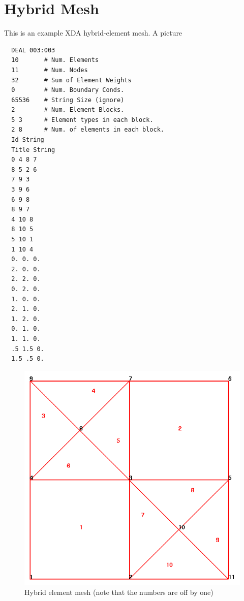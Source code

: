 \documentclass[12pt]{article}
\begin{document}
\clearpage
\appendix
\section{Hybrid Mesh}
This is an example XDA hybrid-element mesh.  A picture
\small
\begin{verbatim}
  DEAL 003:003
  10       # Num. Elements
  11       # Num. Nodes
  32       # Sum of Element Weights
  0        # Num. Boundary Conds.
  65536    # String Size (ignore)
  2        # Num. Element Blocks.
  5 3      # Element types in each block.
  2 8      # Num. of elements in each block.
  Id String
  Title String
  0 4 8 7
  8 5 2 6
  7 9 3
  3 9 6
  6 9 8
  8 9 7
  4 10 8
  8 10 5
  5 10 1
  1 10 4
  0. 0. 0.
  2. 0. 0.
  2. 2. 0.
  0. 2. 0.
  1. 0. 0.
  2. 1. 0.
  1. 2. 0.
  0. 1. 0.
  1. 1. 0.
  .5 1.5 0.
  1.5 .5 0.
\end{verbatim}
\normalsize

\clearpage
\begin{figure}
  \centerline{\includegraphics[width=.9\textwidth]{hybrid_mesh}}
  \caption{Hybrid element mesh (note that the numbers are off by one)}
\end{figure}
\end{document}
